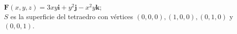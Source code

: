 \item $\mathbf{F}(x, y, z) = 3xy\mathbf{i} + y^2\mathbf{j} - x^2y\mathbf{k}$;\\
    $S$ es la superficie del tetraedro con vértices $(0, 0, 0), (1, 0, 0), (0, 1, 0)$ y $(0, 0, 1)$.
